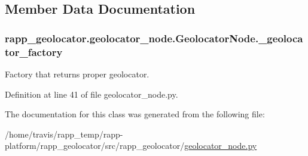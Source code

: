 \subsection{Member Data Documentation}
\hypertarget{classrapp__geolocator_1_1geolocator__node_1_1GeolocatorNode_a51f254d9011693bf7399720e12b1d108}{
\subsubsection[{\-\_\-geolocator\-\_\-factory}]{\setlength{\rightskip}{0pt plus 5cm}rapp\-\_\-geolocator.\-geolocator\-\_\-node.\-Geolocator\-Node.\-\_\-geolocator\-\_\-factory\hspace{0.3cm}{\ttfamily [private]}}}\label{classrapp__geolocator_1_1geolocator__node_1_1GeolocatorNode_a51f254d9011693bf7399720e12b1d108}


Factory that returns proper geolocator. 



Definition at line 41 of file geolocator\-\_\-node.\-py.



The documentation for this class was generated from the following file\-:\begin{DoxyCompactItemize}
\item 
/home/travis/rapp\-\_\-temp/rapp-\/platform/rapp\-\_\-geolocator/src/rapp\-\_\-geolocator/\hyperlink{geolocator__node_8py}{geolocator\-\_\-node.\-py}\end{DoxyCompactItemize}
